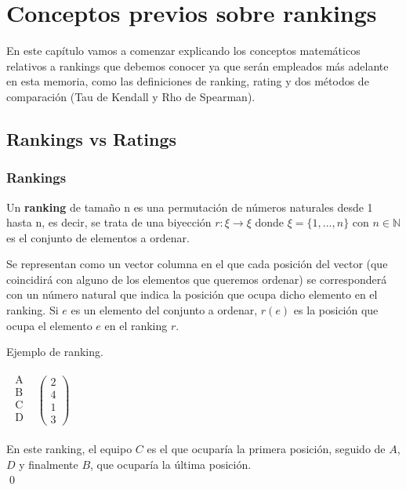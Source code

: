 \chapter{Conceptos previos sobre rankings}
En este capítulo vamos a comenzar explicando los conceptos matemáticos relativos a rankings que debemos conocer ya que serán empleados más adelante en esta memoria, como las definiciones de ranking, rating y dos métodos de comparación (Tau de Kendall y Rho de Spearman).

\section{Rankings vs Ratings}

\subsection*{Rankings}
\begin{defi} 
	Un \textbf{ranking} de tamaño n es una permutación de números naturales desde 1 hasta n, es decir, se trata de una biyección $r: \xi \rightarrow \xi$ donde $\xi = \{1,...,n\}$ con $n \in \mathbb{N}$ es el conjunto de elementos a ordenar.
\end{defi}

Se representan como un vector columna en el que cada posición del vector (que coincidirá con alguno de los elementos que queremos ordenar) se corresponderá con un número natural que indica la posición que ocupa dicho elemento en el ranking.  Si $e$ es un elemento del conjunto a ordenar, $r(e)$ es la posición que ocupa el elemento $e$ en el ranking $r$.
 
\begin{ejem} \label{ejem1}
Ejemplo de ranking.
\end{ejem}
\begin{center}
$\begin{array}{ccc}
\begin{array}{c}
\text{A}\\
\text{B} \\
\text{C} \\
\text{D} \\
\end{array} & \left(\begin{array}{c}
2\\
4\\
1\\
3
\end{array} \right)
\end{array}  $
\end{center}
En este ranking, el equipo $C$ es el que ocuparía la primera posición, seguido de $A$, $D$ y finalmente $B$, que ocuparía la última posición.\\
\qed

